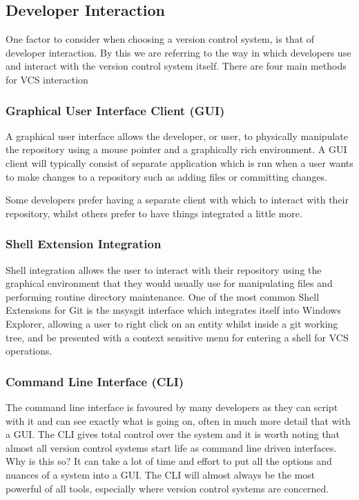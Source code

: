 \subsection{Developer Interaction}
One factor to consider when choosing a version control system, is that of developer interaction.
By this we are referring to the way in which developers use and interact with the version control system itself.
There are four main methods for VCS interaction

\subsubsection{Graphical User Interface Client (GUI)}
A graphical user interface allows the developer, or user, to physically manipulate the repository using a mouse pointer and a graphically rich environment.
A GUI client will typically consist of separate application which is run when a user wants to make changes to a repository such as adding files or committing changes.

Some developers prefer having a separate client with which to interact with their repository, whilst others prefer to have things integrated a little more.

\subsubsection{Shell Extension Integration}
Shell integration allows the user to interact with their repository using the graphical environment that they would usually use for manipulating files and performing routine directory maintenance.
One of the most common Shell Extensions for Git is the msysgit interface which integrates itself into Windows Explorer, allowing a user to right click on an entity whilst inside a git working tree, and be presented with a context sensitive menu for entering a shell for VCS operations.

\subsubsection{Command Line Interface (CLI)}
The command line interface is favoured by many developers as they can script with it and can see exactly what is going on, often in much more detail that with a GUI.
The CLI gives total control over the system and it is worth noting that almost all version control systems start life as command line driven interfaces.
Why is this so? It can take a lot of time and effort to put all the options and nuances of a system into a GUI.
The CLI will almost always be the most powerful of all tools, especially where version control systems are concerned.

